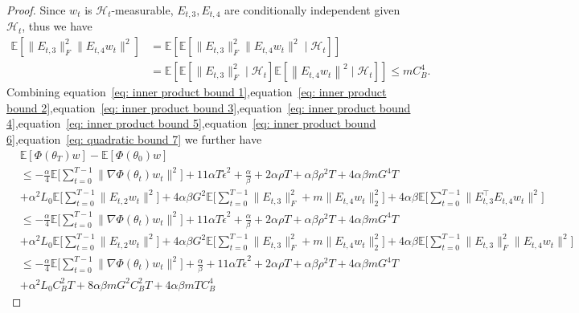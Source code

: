 \documentclass[twoside]{article} %
\def\eqref#1{equation~\ref{#1}}
\theoremstyle{plain}
\theoremstyle{definition}
\theoremstyle{remark}
\newcommand{\tepsilon}{\tilde{\epsilon}}
\newcommand{\calH}{\mathcal{H}}
\begin{document}
\begin{proof}
Since $w_t$ is $\calH_t$-measurable, $E_{t, 3}, E_{t, 4}$ are conditionally independent given $\mathcal{H}_t$, thus we have
\begin{align}
\mathbb{E}[\|E_{t, 3}\|_F^2\|E_{t, 4} w_t\|^2]  &=\mathbb{E}[\mathbb{E}[\|E_{t, 3}\|_F^2\|E_{t, 4} w_t\|^2 \mid \mathcal{H}_t]] \nonumber\\
& =\mathbb{E}[\mathbb{E}[\|E_{t, 3}\|_F^2 \mid \mathcal{H}_t] \mathbb{E}[\left\|E_{t, 4} w_t\right\|^2 \mid \mathcal{H}_t]] \leq m C_B^4.
\label{eq: quadratic bound 7}
\end{align}
Combining \eqref{eq: inner product bound 1},\eqref{eq: inner product bound 2},\eqref{eq: inner product bound 3},\eqref{eq: inner product bound 4},\eqref{eq: inner product bound 5},\eqref{eq: inner product bound 6},\eqref{eq: quadratic bound 7} we further have
\begin{align}
    &\mathbb{E}[\Phi(\theta_{T}){w}] - \mathbb{E}[\Phi({\theta}_0){w}] \nonumber\\
    &\leq -\frac{\alpha}{4} \mathbb{E}\big[\sum_{t=0}^{T-1}\|\nabla \Phi({\theta}_t){w}_t \|^2\big] +{11\alpha T \tepsilon^2} +\frac{\alpha}{\beta}+ 2\alpha \rho T + \alpha\beta\rho^2T + 4\alpha\beta mG^4 T\nonumber\\
    &+\alpha^2 L_0 \mathbb{E}\big[ \sum_{t=0}^{T-1} \|E_{t,2}w_t\|^2\big] +4\alpha\beta G^2 \mathbb{E}\big [\sum_{t=0}^{T-1} \|E_{t,3} \|_F^2+m\|{E}_{t,4}w_t\|_2^2 \big] + 4\alpha\beta \mathbb{E}\big[\sum_{t=0}^{T-1} \|E_{t,3}^{\top}E_{t,4}w_t\|^2 \big] \nonumber\\
    &\leq -\frac{\alpha}{4} \mathbb{E}\big[\sum_{t=0}^{T-1}\|\nabla \Phi({\theta}_t){w}_t \|^2\big] +{11\alpha T \tepsilon^2} +\frac{\alpha}{\beta}+ 2\alpha \rho T + \alpha\beta\rho^2T + 4\alpha\beta m G^4 T\nonumber\\
    &+\alpha^2 L_0 \mathbb{E}\big[ \sum_{t=0}^{T-1} \|E_{t,2}w_t\|^2\big] +4\alpha\beta  G^2 \mathbb{E}\big [\sum_{t=0}^{T-1} \|E_{t,3} \|_F^2+m\|E_{t,4}w_t\|_2^2 \big] + 4\alpha\beta \mathbb{E}\big[\sum_{t=0}^{T-1} \|E_{t,3}\|^2_F \|E_{t,4}w_t\|^2 \big] \nonumber\\
    &\leq -\frac{\alpha}{4} \mathbb{E}\big[\sum_{t=0}^{T-1}\|\nabla \Phi({\theta}_t){w}_t \|^2\big] +\frac{\alpha}{\beta}+{11\alpha T \tepsilon^2} + 2\alpha \rho T + \alpha\beta\rho^2T + 4\alpha\beta m G^4 T\nonumber\\
    &+\alpha^2 L_0 C_B^2T+8\alpha\beta m G^2C_B^2T + 4\alpha\beta mT C_B^4 

\end{align}
\end{proof}
\end{document}
